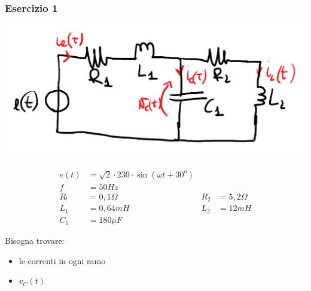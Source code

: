 \documentclass{article}
\begin{document}
\subsubsection{Esercizio 1}
\begin{center}
    \includegraphics[scale=0.26]{Image/Es_Regime_Sinusoiudale_1.png}
\end{center}
\begin{align*}
    e(t) &= \sqrt{2} \cdot 230 \cdot \sin(\omega t + 30^o)\\
    f &= 50 Hz\\
    R_! &= 0,1 \Omega & R_2&=5,2 \Omega\\
    L_1 &= 0,64 mH & L_2 &= 12 mH\\
    C_1 &= 180 \mu F
\end{align*}

Bisogna trovare:
\begin{itemize}
    \item le correnti in ogni ramo
    \item $v_C(t)$
\end{itemize}
\end{document}
